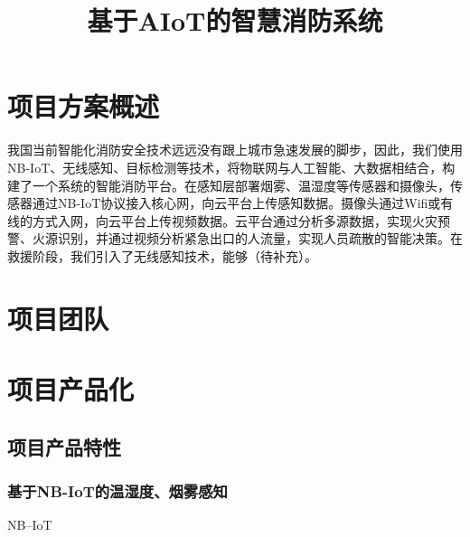 \documentclass{ctexart}
\begin{document}
	\title{基于AIoT的智慧消防系统}
	\section{项目方案概述}
	我国当前智能化消防安全技术远远没有跟上城市急速发展的脚步，因此，我们使用NB-IoT、无线感知、目标检测等技术，将物联网与人工智能、大数据相结合，构建了一个系统的智能消防平台。在感知层部署烟雾、温湿度等传感器和摄像头，传感器通过NB-IoT协议接入核心网，向云平台上传感知数据。摄像头通过Wifi或有线的方式入网，向云平台上传视频数据。云平台通过分析多源数据，实现火灾预警、火源识别，并通过视频分析紧急出口的人流量，实现人员疏散的智能决策。在救援阶段，我们引入了无线感知技术，能够（待补充）。
	\section{项目团队}
	\section{项目产品化}
		\subsection{项目产品特性}
			\subsubsection{基于NB-IoT的温湿度、烟雾感知}
			NB--IoT
\end{document}
